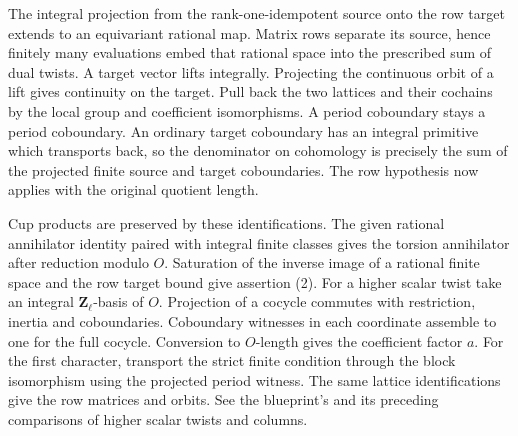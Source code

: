 \begin{outline}
The integral projection from the rank-one-idempotent source onto the row target extends to an equivariant rational map. Matrix rows separate its source, hence finitely many evaluations embed that rational space into the prescribed sum of dual twists. A target vector lifts integrally. Projecting the continuous orbit of a lift gives continuity on the target. Pull back the two lattices and their cochains by the local group and coefficient isomorphisms. A period coboundary stays a period coboundary. An ordinary target coboundary has an integral primitive which transports back, so the denominator on cohomology is precisely the sum of the projected finite source and target coboundaries. The row hypothesis now applies with the original quotient length.

Cup products are preserved by these identifications. The given rational annihilator identity paired with integral finite classes gives the torsion annihilator after reduction modulo \(O\). Saturation of the inverse image of a rational finite space and the row target bound give assertion (2). For a higher scalar twist take an integral \(\mathbf Z_\ell\)-basis of \(O\). Projection of a cocycle commutes with restriction, inertia and coboundaries. Coboundary witnesses in each coordinate assemble to one for the full cocycle. Conversion to \(O\)-length gives the coefficient factor \(a\). For the first character, transport the strict finite condition through the block isomorphism using the projected period witness. The same lattice identifications give the row matrices and orbits. See the blueprint's  and its preceding comparisons of higher scalar twists and columns.
\end{outline}
